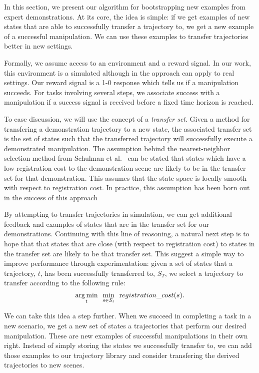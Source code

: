 In this section, we present our algorithm for bootstrapping new examples 
from expert demonstrations. At its core, the idea is simple: if we get
examples of new states that are able to successfully transfer a trajectory to,
we get a new example of a successful manipulation. We can use these examples
to transfer trajectories better in new settings.

Formally, we assume access to an environment and a reward signal. In our work, this
environment is a simulated although in the approach can apply to real settings. 
Our reward signal is a 1-0 response which tells us if a manipulation succeeds. For 
tasks involving several steps, we associate success with a manipulation if a success
signal is received before a fixed time horizon is reached.

To ease discussion, we will use the concept of a \emph{transfer set}. Given a method for
transfering a demonstration trajectory to a new state, the associated transfer set is
the set of states such that the transferred trajectory will successfully execute a
demonstrated manipulation. The assumption behind the nearest-neighbor selection
method from Schulman et al.~\cite{Schulmanetal_ISRR2013} can be stated that states
which have a low registration cost to the demonstration scene are likely to be in the
transfer set for that demonstration. This assumes that the state space is locally
smooth with respect to registration cost. In practice, this assumption has been
born out in the success of this approach


By attempting to transfer trajectories in simulation, we can get additional feedback
and examples of states that are in the transfer set for our demonstrations.
Continuing with this line of reasoning, a natural next step is to hope that that
states that are close (with respect to registration cost) to states in the transfer
set are likely to be that transfer set. This suggest a simple way to improve performance
through experimentation: given a set of
states that a trajectory, $t$,  has been successfully transferred to, $S_T$,
we select a trajectory to transfer according to the following rule:
\begin{equation}
\underset{t}{\operatorname*{arg\,min}} \ \ \underset{s\in S_t}{\min} \ \ {\text registration\_cost}(s).
\end{equation}

We can take this idea a step further. When we succeed in completing a task in a new
scenario, we get a new set of states a trajectories that perform our desired manipulation.
These are new examples of successful manipulations in their own right. Instead of simply storing
the states we successfully transfer to, we can add those examples to our trajectory 
library and consider transfering the derived trajectories to new scenes. 

